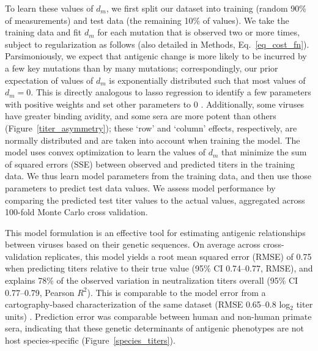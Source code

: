 \documentclass[11pt,oneside,letterpaper]{article}
\begin{document}
To learn these values of $d_m$, we first split our dataset into training (random 90\% of measurements) and test data (the remaining 10\% of values).
We take the training data and fit $d_m$ for each mutation that is observed two or more times, subject to regularization as follows (also detailed in Methods, Eq.~\ref{eq_cost_fn}).
Parsimoniously, we expect that antigenic change is more likely to be incurred by a few key mutations than by many mutations; correspondingly, our prior expectation of values of $d_m$ is exponentially distributed such that most values of $d_m = 0$.
This is directly analogous to lasso regression to identify a few parameters with positive weights and set other parameters to 0 \citep{tibshirani1996regression}.
Additionally, some viruses have greater binding avidity, and some sera are more potent than others (Figure~\ref{titer_asymmetry}); these `row' and `column' effects, respectively, are normally distributed and are taken into account when training the model.
The model uses convex optimization to learn the values of $d_m$ that minimize the sum of squared errors (SSE) between observed and predicted titers in the training data.
We thus learn model parameters from the training data, and then use those parameters to predict test data values.
We assess model performance by comparing the predicted test titer values to the actual values, aggregated across 100-fold Monte Carlo cross validation.

This model formulation is an effective tool for estimating antigenic relationships between viruses based on their genetic sequences.
On average across cross-validation replicates, this model yields a root mean squared error (RMSE) of 0.75 when predicting titers relative to their true value (95\% CI 0.74--0.77, RMSE), and explains 78\% of the observed variation in neutralization titers overall (95\% CI 0.77--0.79, Pearson $R^2$).
This is comparable to the model error from a cartography-based characterization of the same dataset (RMSE 0.65--0.8 log$_2$ titer units) \citep{katzelnick2015dengue}.
Prediction error was comparable between human and non-human primate sera, indicating that these genetic determinants of antigenic phenotypes are not host species-specific (Figure~\ref{species_titers}).
\end{document}
